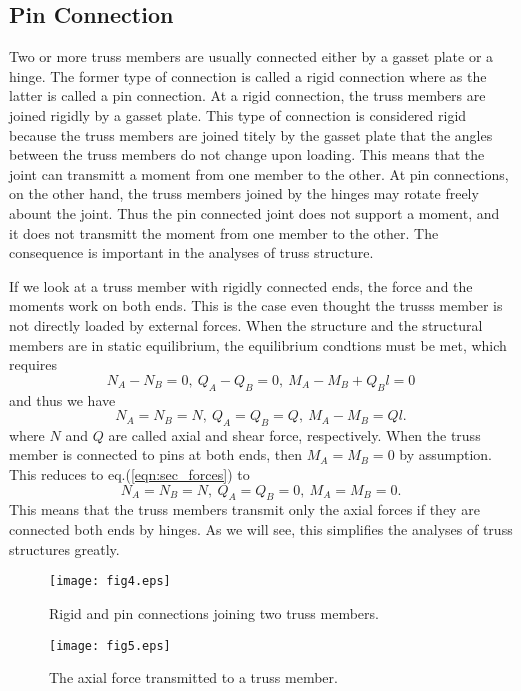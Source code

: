 \documentclass[10pt,a4j]{article}
\begin{document}
\subsection{Pin Connection}
Two or more truss members are usually connected either by a gasset plate or a hinge. 
The former type of connection is called a rigid connection where as the latter 
is called a pin connection.
At a rigid connection, the truss members are joined rigidly by a gasset plate.
This type of connection is considered rigid because the truss members are joined 
titely by the gasset plate that the angles between the truss members do not 
change upon loading. 
This means that the joint can transmitt a moment from one member to the other. 
At pin connections, on the other hand, the truss members joined by the 
hinges may rotate freely abount the joint. 
Thus the pin connected joint does not support a moment, and it does not 
transmitt the moment from one member to the other. 
The consequence is important in the analyses of truss structure. 

If we look at a truss member with rigidly connected ends, 
the force and the moments work on both ends. This is the case 
even thought the trusss member is not directly loaded by external forces. 
When the structure and the structural members are in static equilibrium, the 
equilibrium condtions must be met, which requires
\begin{equation}
	N_A-N_B=0, \ Q_A-Q_B=0, \  M_A-M_B+Q_Bl=0 
	\label{eqn:}
\end{equation}
\begin{equation}
\end{equation}
and thus we have
\begin{equation}
	N_A=N_B=N,\  Q_A=Q_B=Q, \  M_A-M_B=Ql.
	\label{eqn:sec_forces}
\end{equation}
where $N$ and $Q$ are called axial and shear force, respectively.
When the truss member is connected to pins at both ends, then 
$M_A=M_B=0$ by assumption. This reduces to eq.(\ref{eqn:sec_forces}) 
to 
\begin{equation}
	N_A=N_B=N,\  Q_A=Q_B=0, \  M_A=M_B=0.
	\label{eqn:sec_forces}
\end{equation}
This means that the truss members transmit only the axial forces 
 if they are connected both ends by hinges.
 As we will see, this simplifies the analyses of truss structures greatly. 
\begin{figure}[h]
	\begin{center}
	\texttt{[image: fig4.eps]} 
	\end{center}
	\caption{Rigid and pin connections joining two truss members.} 
	\label{fig:fig4}
\end{figure}
\begin{figure}[h]
	\begin{center}
	\texttt{[image: fig5.eps]} 
	\end{center}
	\caption{The axial force transmitted to a truss member.}
	\label{fig:fig5}
\end{figure}
\end{document}
